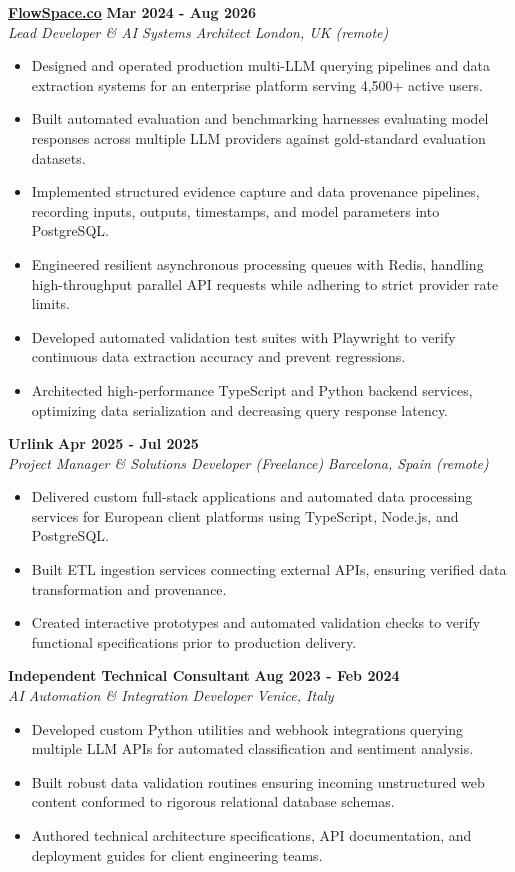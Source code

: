 \documentclass[10pt,a4paper]{article}
\newcommand{\role}[4]{%
  \textbf{#1} \hfill \textbf{#2}\\[1pt]%
  \textit{#3} \hfill \textit{#4}\\[2pt]%
}
\begin{document}
\role{\href{https://flowspace.co}{FlowSpace.co}}{Mar 2024 - Aug 2026}{Lead Developer \& AI Systems Architect}{London, UK (remote)}
\begin{itemize}
  \item Designed and operated production multi-LLM querying pipelines and data extraction systems for an enterprise platform serving 4,500+ active users.
  \item Built automated evaluation and benchmarking harnesses evaluating model responses across multiple LLM providers against gold-standard evaluation datasets.
  \item Implemented structured evidence capture and data provenance pipelines, recording inputs, outputs, timestamps, and model parameters into PostgreSQL.
  \item Engineered resilient asynchronous processing queues with Redis, handling high-throughput parallel API requests while adhering to strict provider rate limits.
  \item Developed automated validation test suites with Playwright to verify continuous data extraction accuracy and prevent regressions.
  \item Architected high-performance TypeScript and Python backend services, optimizing data serialization and decreasing query response latency.
\end{itemize}

\role{Urlink}{Apr 2025 - Jul 2025}{Project Manager \& Solutions Developer (Freelance)}{Barcelona, Spain (remote)}
\begin{itemize}
  \item Delivered custom full-stack applications and automated data processing services for European client platforms using TypeScript, Node.js, and PostgreSQL.
  \item Built ETL ingestion services connecting external APIs, ensuring verified data transformation and provenance.
  \item Created interactive prototypes and automated validation checks to verify functional specifications prior to production delivery.
\end{itemize}

\role{Independent Technical Consultant}{Aug 2023 - Feb 2024}{AI Automation \& Integration Developer}{Venice, Italy}
\begin{itemize}
  \item Developed custom Python utilities and webhook integrations querying multiple LLM APIs for automated classification and sentiment analysis.
  \item Built robust data validation routines ensuring incoming unstructured web content conformed to rigorous relational database schemas.
  \item Authored technical architecture specifications, API documentation, and deployment guides for client engineering teams.
\end{itemize}
\end{document}
